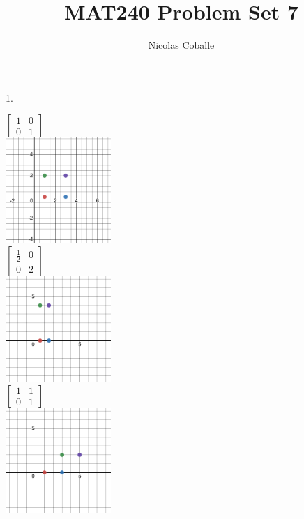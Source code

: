 \documentclass[11pt]{article}
\title{MAT240 Problem Set 7}
\author{Nicolas Coballe}
\begin{document}
\maketitle
\begin{flushleft}

1.

$\begin{bmatrix}
1 & 0 \\
0 & 1
\end{bmatrix}$ \\
\includegraphics[width=0.3\textwidth]{square1.png} \\

$\begin{bmatrix}
\frac{1}{2} & 0 \\
0 & 2
\end{bmatrix}$ \\
\includegraphics[width=0.3\textwidth]{square2.png} \\

$\begin{bmatrix}
1 & 1 \\
0 & 1
\end{bmatrix}$ \\
\includegraphics[width=0.3\textwidth]{square3.png} \\


\end{flushleft}
\end{document}
